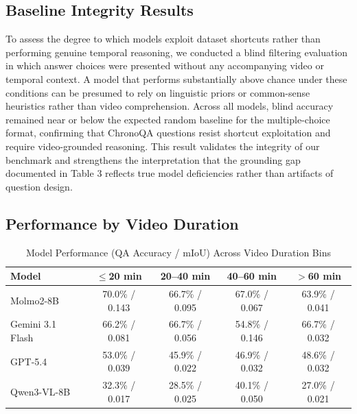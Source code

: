 \documentclass[sigconf,natbib=false,nonacm]{acmart}
\begin{document}
\subsection{Baseline Integrity Results}
To assess the degree to which models exploit dataset shortcuts rather than performing genuine temporal reasoning, we conducted a blind filtering evaluation in which answer choices were presented without any accompanying video or temporal context. A model that performs substantially above chance under these conditions can be presumed to rely on linguistic priors or common-sense heuristics rather than video comprehension. Across all models, blind accuracy remained near or below the expected random baseline for the multiple-choice format, confirming that ChronoQA questions resist shortcut exploitation and require video-grounded reasoning. This result validates the integrity of our benchmark and strengthens the interpretation that the grounding gap documented in Table 3 reflects true model deficiencies rather than artifacts of question design.

\subsection{Performance by Video Duration}
\begin{table}[ht]
\centering
\caption{Model Performance (QA Accuracy / mIoU) Across Video Duration Bins}
\label{tab:metrics_duration}
\begin{tabular}{lcccc}
\hline
\textbf{Model} & \textbf{$\leq$20 min} & \textbf{20--40 min} & \textbf{40--60 min} & \textbf{$>$60 min} \\ \hline
Molmo2-8B & 70.0\% / 0.143 & 66.7\% / 0.095 & 67.0\% / 0.067 & 63.9\% / 0.041 \\
Gemini 3.1 Flash  & 66.2\% / 0.081 & 66.7\% / 0.056 & 54.8\% / 0.146 & 66.7\% / 0.032 \\
GPT-5.4 & 53.0\% / 0.039 & 45.9\% / 0.022 & 46.9\% / 0.032 & 48.6\% / 0.032 \\
Qwen3-VL-8B & 32.3\% / 0.017 & 28.5\% / 0.025 & 40.1\% / 0.050 & 27.0\% / 0.021 \\ \hline
\end{tabular}
\end{table}
\end{document}
